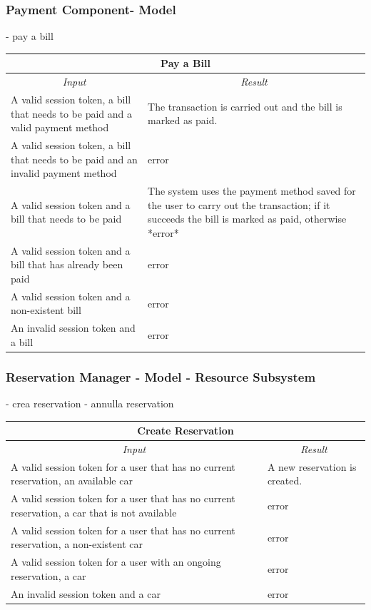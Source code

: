 \documentclass[english]{article}
\begin{document}
\subsubsection{Payment Component- Model}
- pay a bill 

\begin{center}

	\begin{tabular}{ | p{6cm} | p{6cm} | }
		\hline 
		\multicolumn{2}{|c|}{\textbf{Pay a Bill}} \\
		\hline
		\multicolumn{1}{|c|}{\textit{Input}} & \multicolumn{1}{c|}{\textit{Result}} \\
		\hline
		A valid session token, a bill that needs to be paid and a valid payment method &  The transaction is carried out and the bill is marked as paid. \\
		\hline
		A valid session token, a bill that needs to be paid and an invalid payment method & error \\ %
		A valid session token and a bill that needs to be paid & The system uses the payment method saved for the user to carry out the transaction; if it succeeds the bill is marked as paid, otherwise *error* \\
		\hline
		A valid session token and a bill that has already been paid & error \\
		\hline
		A valid session token and a non-existent bill & error \\
		\hline
		An invalid session token and a bill & error \\
		\hline
	\end{tabular}
\end{center}

\subsubsection{Reservation Manager - Model - Resource Subsystem}
- crea reservation
- annulla reservation

\begin{center}

	\begin{tabular}{ | p{6cm} | p{6cm} | }
		\hline 
		\multicolumn{2}{|c|}{\textbf{Create Reservation}} \\
		\hline
		\multicolumn{1}{|c|}{\textit{Input}} & \multicolumn{1}{c|}{\textit{Result}} \\
		\hline
		A valid session token for a user that has no current reservation, an available car & A new reservation is created. \\
		\hline
		A valid session token for a user that has no current reservation, a car that is not available & error \\
		\hline
		A valid session token for a user that has no current reservation, a non-existent car & error \\
		\hline
		A valid session token for a user with an ongoing reservation, a car & error \\
		\hline
		An invalid session token and a car & error \\
		\hline
	\end{tabular}
\end{center}
\end{document}
